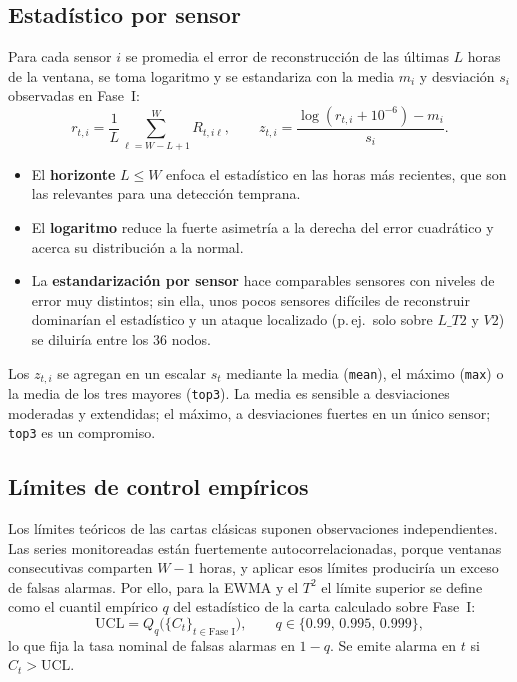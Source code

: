 \documentclass[11pt,a4paper]{article}
\newcommand{\UCL}{\mathrm{UCL}}
\begin{document}
\subsection{Estadístico por sensor}
\label{sec:zscore}

Para cada sensor $i$ se promedia el error de reconstrucción de las últimas $L$ horas
de la ventana, se toma logaritmo y se estandariza con la media $m_i$ y desviación
$s_i$ observadas en Fase~I:
\begin{equation}
r_{t,i}=\frac1L\sum_{\ell=W-L+1}^{W}R_{t,i\ell},\qquad
z_{t,i}=\frac{\log(r_{t,i}+10^{-6})-m_i}{s_i}.
\label{eq:zscore}
\end{equation}
\begin{itemize}
\item El \textbf{horizonte} $L\le W$ enfoca el estadístico en las horas más
  recientes, que son las relevantes para una detección temprana.
\item El \textbf{logaritmo} reduce la fuerte asimetría a la derecha del error
  cuadrático y acerca su distribución a la normal.
\item La \textbf{estandarización por sensor} hace comparables sensores con niveles de
  error muy distintos; sin ella, unos pocos sensores difíciles de reconstruir
  dominarían el estadístico y un ataque localizado (p.\,ej.\ solo sobre $L\_T2$ y
  $V2$) se diluiría entre los 36 nodos.
\end{itemize}

Los $z_{t,i}$ se agregan en un escalar $s_t$ mediante la media (\texttt{mean}), el
máximo (\texttt{max}) o la media de los tres mayores (\texttt{top3}). La media es
sensible a desviaciones moderadas y extendidas; el máximo, a desviaciones fuertes en
un único sensor; \texttt{top3} es un compromiso.

\subsection{Límites de control empíricos}

Los límites teóricos de las cartas clásicas suponen observaciones independientes. Las
series monitoreadas están fuertemente autocorrelacionadas, porque ventanas consecutivas
comparten $W-1$ horas, y aplicar esos límites produciría un exceso de falsas alarmas.
Por ello, para la EWMA y el $T^2$ el límite superior se define como el cuantil
empírico $q$ del estadístico de la carta calculado sobre Fase~I:
\begin{equation}
\UCL = Q_q\big(\{C_t\}_{t\in\text{Fase I}}\big),\qquad q\in\{0.99,\,0.995,\,0.999\},
\end{equation}
lo que fija la tasa nominal de falsas alarmas en $1-q$. Se emite alarma en $t$ si
$C_t>\UCL$.
\end{document}
